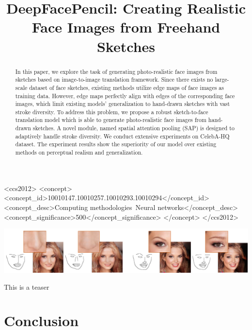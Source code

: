 \documentclass[sigconf,anonymous,review]{acmart}
\begin{document}
\title{DeepFacePencil: Creating Realistic Face Images from Freehand Sketches}

\begin{abstract}
In this paper, we explore the task of generating photo-realistic face images from sketches based on image-to-image translation framework. 
Since there exists no large-scale dataset of face sketches, existing methods utilize edge maps of face images as training data. However, edge maps perfectly align with edges of the corresponding face images, which limit existing models' generalization to hand-drawn sketches with vast stroke diversity. 
To address this problem, we propose a robust sketch-to-face translation model which is able to generate photo-realistic face images from hand-drawn sketches. 
A novel module, named spatial attention pooling (SAP) is designed to adaptively handle stroke diversity.
We conduct extensive experiments on CelebA-HQ dataset. The experiment results show the superiority of our model over existing methods on perceptual realism and generalization.
\end{abstract}

%
\begin{CCSXML}
	<ccs2012>
	<concept>
	<concept_id>10010147.10010257.10010293.10010294</concept_id>
	<concept_desc>Computing methodologies~Neural networks</concept_desc>
	<concept_significance>500</concept_significance>
	</concept>
	</ccs2012>
\end{CCSXML}



%
%



\begin{teaserfigure}
	\includegraphics[width=\textwidth]{figs/teaser.png}
	\caption{This is a teaser}
	\label{fig:teaser}
\end{teaserfigure}


\maketitle







\section{Conclusion}


\balance 
%
%
\end{document}
